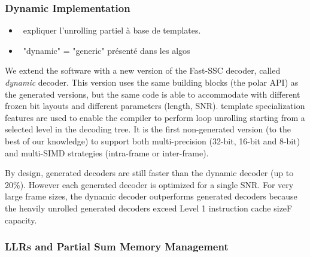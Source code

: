 \subsubsection{Dynamic Implementation}

\begin{itemize}
  \item \xmark~expliquer l'unrolling partiel à base de templates.
  \item \xmark~"dynamic" = "generic" présenté dans les algos
\end{itemize}

We extend the \AFFECT software with a new version of the Fast-SSC decoder,
called \emph{dynamic} decoder. This version uses the same building blocks (the
polar API) as the generated versions, but the same code is able to accommodate
with different frozen bit layouts and different parameters (length, SNR).
 template specialization features are used to enable the compiler to
perform loop unrolling starting from a selected level in the decoding tree. It
is the first non-generated version (to the best of our knowledge) to support
both multi-precision (32-bit, 16-bit and 8-bit) and multi-SIMD strategies
(intra-frame or inter-frame).

By design, generated decoders are still faster than the dynamic decoder (up to
20\%). However each generated decoder is optimized for a single SNR. For very
large frame sizes, the dynamic decoder outperforms generated decoders because
the heavily unrolled generated decoders exceed Level 1 instruction cache sizeF
capacity.

\subsubsection{LLRs and Partial Sum Memory Management}

